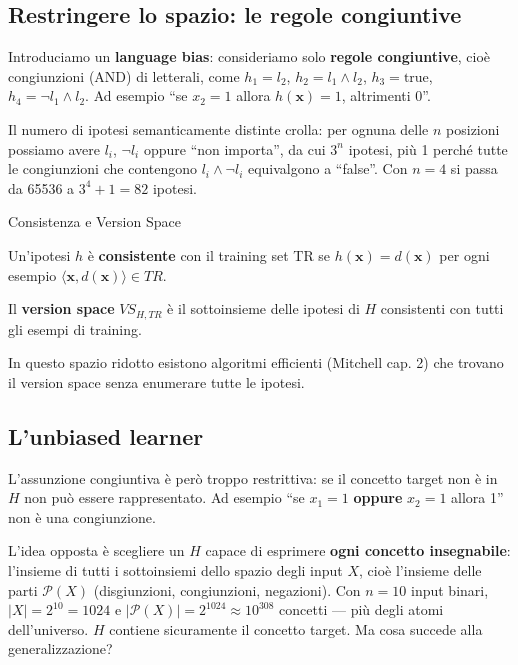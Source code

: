 \subsection{Restringere lo spazio: le regole
congiuntive}\label{restringere-lo-spazio-le-regole-congiuntive}

Introduciamo un \textbf{language bias}: consideriamo solo \textbf{regole
congiuntive}, cioè congiunzioni (AND) di letterali, come \(h_1 = l_2\),
\(h_2 = l_1 \wedge l_2\), \(h_3 = \text{true}\),
\(h_4 = \neg l_1 \wedge l_2\). Ad esempio ``se \(x_2 = 1\) allora
\(h(\mathbf{x}) = 1\), altrimenti \(0\)''.

Il numero di ipotesi semanticamente distinte crolla: per ognuna delle
\(n\) posizioni possiamo avere \(l_i\), \(\neg l_i\) oppure ``non
importa'', da cui \(3^n\) ipotesi, più 1 perché tutte le congiunzioni
che contengono \(l_i \wedge \neg l_i\) equivalgono a ``false''. Con
\(n = 4\) si passa da 65536 a \(3^4 + 1 = 82\) ipotesi.

\begin{boxdefinition}{Consistenza e Version Space}

Un'ipotesi \(h\) è \textbf{consistente} con il training set TR se
\(h(\mathbf{x}) = d(\mathbf{x})\) per ogni esempio
\(\langle \mathbf{x}, d(\mathbf{x})\rangle \in TR\).

Il \textbf{version space} \(VS_{H,TR}\) è il sottoinsieme delle ipotesi
di \(H\) consistenti con tutti gli esempi di training.

\end{boxdefinition}

In questo spazio ridotto esistono algoritmi efficienti (Mitchell cap. 2)
che trovano il version space senza enumerare tutte le ipotesi.

\subsection{L'unbiased learner}\label{lunbiased-learner}

L'assunzione congiuntiva è però troppo restrittiva: se il concetto
target non è in \(H\) non può essere rappresentato. Ad esempio ``se
\(x_1 = 1\) \textbf{oppure} \(x_2 = 1\) allora 1'' non è una
congiunzione.

L'idea opposta è scegliere un \(H\) capace di esprimere \textbf{ogni
concetto insegnabile}: l'insieme di tutti i sottoinsiemi dello spazio
degli input \(X\), cioè l'insieme delle parti \(\mathcal{P}(X)\)
(disgiunzioni, congiunzioni, negazioni). Con \(n = 10\) input binari,
\(|X| = 2^{10} = 1024\) e
\(|\mathcal{P}(X)| = 2^{1024} \approx 10^{308}\) concetti --- più degli
atomi dell'universo. \(H\) contiene sicuramente il concetto target. Ma
cosa succede alla generalizzazione?

